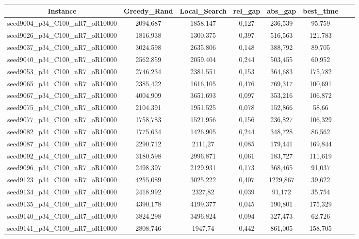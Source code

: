 \documentclass[a4paper]{article}
\begin{document}
\begin{center}
\begin{longtable}{cccccccc}
\tabularnewline
\hline
Instance & Greedy\_Rand & Local\_Search & rel\_gap & abs\_gap & best\_time\\
\hline
seed9004\_p34\_C100\_nR7\_oR10000 & 2094,687 & 1858,147 & 0,127 & 236,539 & 95,759\\
\hline
seed9026\_p34\_C100\_nR7\_oR10000 & 1816,938 & 1300,375 & 0,397 & 516,563 & 121,783\\
\hline
seed9037\_p34\_C100\_nR7\_oR10000 & 3024,598 & 2635,806 & 0,148 & 388,792 & 89,705\\
\hline
seed9040\_p34\_C100\_nR7\_oR10000 & 2562,859 & 2059,404 & 0,244 & 503,455 & 60,952\\
\hline
seed9053\_p34\_C100\_nR7\_oR10000 & 2746,234 & 2381,551 & 0,153 & 364,683 & 175,782\\
\hline
seed9065\_p34\_C100\_nR7\_oR10000 & 2385,422 & 1616,105 & 0,476 & 769,317 & 100,691\\
\hline
seed9067\_p34\_C100\_nR7\_oR10000 & 4004,909 & 3651,693 & 0,097 & 353,216 & 106,872\\
\hline
seed9075\_p34\_C100\_nR7\_oR10000 & 2104,391 & 1951,525 & 0,078 & 152,866 & 58,66\\
\hline
seed9077\_p34\_C100\_nR7\_oR10000 & 1758,783 & 1521,956 & 0,156 & 236,827 & 106,329\\
\hline
seed9082\_p34\_C100\_nR7\_oR10000 & 1775,634 & 1426,905 & 0,244 & 348,728 & 86,562\\
\hline
seed9087\_p34\_C100\_nR7\_oR10000 & 2290,712 & 2111,27 & 0,085 & 179,441 & 169,844\\
\hline
seed9092\_p34\_C100\_nR7\_oR10000 & 3180,598 & 2996,871 & 0,061 & 183,727 & 111,619\\
\hline
seed9096\_p34\_C100\_nR7\_oR10000 & 2498,397 & 2129,931 & 0,173 & 368,465 & 91,037\\
\hline
seed9123\_p34\_C100\_nR7\_oR10000 & 4255,089 & 3025,222 & 0,407 & 1229,867 & 39,622\\
\hline
seed9134\_p34\_C100\_nR7\_oR10000 & 2418,992 & 2327,82 & 0,039 & 91,172 & 35,754\\
\hline
seed9135\_p34\_C100\_nR7\_oR10000 & 4390,178 & 4199,377 & 0,045 & 190,801 & 175,329\\
\hline
seed9140\_p34\_C100\_nR7\_oR10000 & 3824,298 & 3496,824 & 0,094 & 327,473 & 62,726\\
\hline
seed9141\_p34\_C100\_nR7\_oR10000 & 2808,746 & 1947,74 & 0,442 & 861,005 & 158,705\\

\end{longtable}
\end{center}
\end{document}
